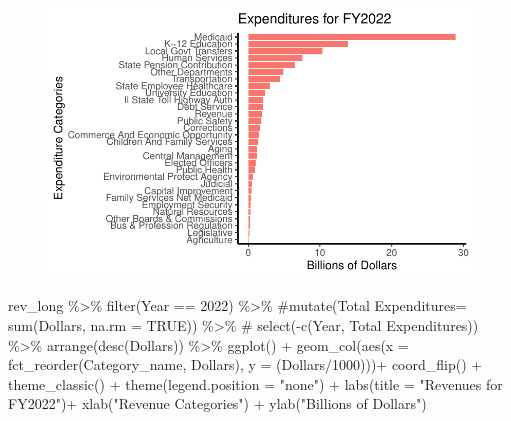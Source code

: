 \documentclass[
  letterpaper,
  DIV=11,
  numbers=noendperiod]{scrreport}
\newenvironment{Shaded}{\begin{snugshade}}{\end{snugshade}}
\newcommand{\AttributeTok}[1]{\textcolor[rgb]{0.40,0.45,0.13}{#1}}
\newcommand{\CommentTok}[1]{\textcolor[rgb]{0.37,0.37,0.37}{#1}}
\newcommand{\DecValTok}[1]{\textcolor[rgb]{0.68,0.00,0.00}{#1}}
\newcommand{\FunctionTok}[1]{\textcolor[rgb]{0.28,0.35,0.67}{#1}}
\newcommand{\NormalTok}[1]{\textcolor[rgb]{0.00,0.23,0.31}{#1}}
\newcommand{\SpecialCharTok}[1]{\textcolor[rgb]{0.37,0.37,0.37}{#1}}
\newcommand{\StringTok}[1]{\textcolor[rgb]{0.13,0.47,0.30}{#1}}
\begin{document}
\begin{figure}[H]

{\centering \includegraphics{./Everything_files/figure-pdf/unnamed-chunk-8-1.pdf}

}

\end{figure}

\begin{Shaded}
\begin{Highlighting}[]
\NormalTok{rev\_long }\SpecialCharTok{\%\textgreater{}\%}
  \FunctionTok{filter}\NormalTok{(Year }\SpecialCharTok{==} \DecValTok{2022}\NormalTok{) }\SpecialCharTok{\%\textgreater{}\%}
  \CommentTok{\#mutate(\textasciigrave{}Total Expenditures\textasciigrave{}= sum(Dollars, na.rm = TRUE)) \%\textgreater{}\%}
 \CommentTok{\# select({-}c(Year, \textasciigrave{}Total Expenditures\textasciigrave{})) \%\textgreater{}\%}
  \FunctionTok{arrange}\NormalTok{(}\FunctionTok{desc}\NormalTok{(}\StringTok{\textasciigrave{}}\AttributeTok{Dollars}\StringTok{\textasciigrave{}}\NormalTok{)) }\SpecialCharTok{\%\textgreater{}\%}
  \FunctionTok{ggplot}\NormalTok{() }\SpecialCharTok{+} 
  \FunctionTok{geom\_col}\NormalTok{(}\FunctionTok{aes}\NormalTok{(}\AttributeTok{x =} \FunctionTok{fct\_reorder}\NormalTok{(Category\_name, }\StringTok{\textasciigrave{}}\AttributeTok{Dollars}\StringTok{\textasciigrave{}}\NormalTok{), }\AttributeTok{y =}\NormalTok{ (}\StringTok{\textasciigrave{}}\AttributeTok{Dollars}\StringTok{\textasciigrave{}}\SpecialCharTok{/}\DecValTok{1000}\NormalTok{)))}\SpecialCharTok{+} 
  \FunctionTok{coord\_flip}\NormalTok{() }\SpecialCharTok{+}
    \FunctionTok{theme\_classic}\NormalTok{() }\SpecialCharTok{+}
    \FunctionTok{theme}\NormalTok{(}\AttributeTok{legend.position =} \StringTok{"none"}\NormalTok{) }\SpecialCharTok{+}
      \FunctionTok{labs}\NormalTok{(}\AttributeTok{title =} \StringTok{"Revenues for FY2022"}\NormalTok{)}\SpecialCharTok{+}
    \FunctionTok{xlab}\NormalTok{(}\StringTok{"Revenue Categories"}\NormalTok{) }\SpecialCharTok{+}
  \FunctionTok{ylab}\NormalTok{(}\StringTok{"Billions of Dollars"}\NormalTok{) }
\end{Highlighting}
\end{Shaded}
\end{document}
